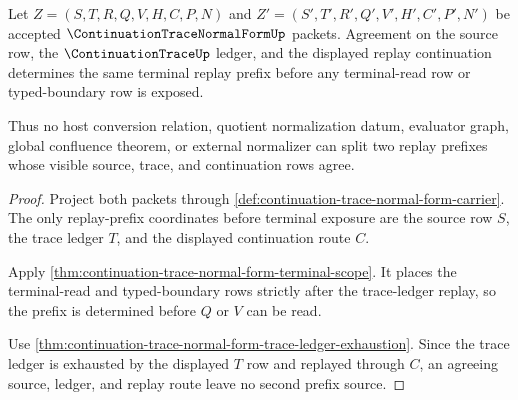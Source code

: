 \begin{theorem}
\label{thm:continuation-trace-normal-form-replay-prefix-determinacy}
Let $Z=(S,T,R,Q,V,H,C,P,N)$ and $Z'=(S',T',R',Q',V',H',C',P',N')$ be accepted $\ContinuationTraceNormalFormUp$ packets. Agreement on the source row, the $\ContinuationTraceUp$ ledger, and the displayed replay continuation determines the same terminal replay prefix before any terminal-read row or typed-boundary row is exposed.

Thus no host conversion relation, quotient normalization datum, evaluator graph, global confluence theorem, or external normalizer can split two replay prefixes whose visible source, trace, and continuation rows agree.
\end{theorem}
\begin{proof}
Project both packets through \autoref{def:continuation-trace-normal-form-carrier}. The only replay-prefix coordinates before terminal exposure are the source row $S$, the trace ledger $T$, and the displayed continuation route $C$.

Apply \autoref{thm:continuation-trace-normal-form-terminal-scope}. It places the terminal-read and typed-boundary rows strictly after the trace-ledger replay, so the prefix is determined before $Q$ or $V$ can be read.

Use \autoref{thm:continuation-trace-normal-form-trace-ledger-exhaustion}. Since the trace ledger is exhausted by the displayed $T$ row and replayed through $C$, an agreeing source, ledger, and replay route leave no second prefix source.
\end{proof}

